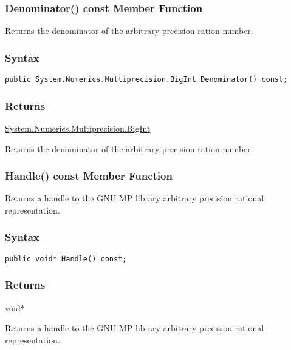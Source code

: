 \documentclass[a4paper,oneside,11.000000pt]{book}
\begin{document}
\hypertarget{System.Numerics.Multiprecision.BigRational.Denominator.C.P.System.Numerics.Multiprecision.BigRational}{\subsubsection*{Denominator() const Member Function}}
\begin{flushleft}
Returns the denominator of the arbitrary precision ration number.

\end{flushleft}
\subsubsection*{Syntax}
\texttt{public System.Numerics.Multiprecision.BigInt Denominator() const;}
\subsubsection*{Returns}
\hyperlink{System.Numerics.Multiprecision.BigInt}{System.\-Numerics.\-Multiprecision.\-BigInt}
\begin{flushleft}
Returns the denominator of the arbitrary precision ration number.

\end{flushleft}
\clearpage

\hypertarget{System.Numerics.Multiprecision.BigRational.Handle.C.P.System.Numerics.Multiprecision.BigRational}{\subsubsection*{Handle() const Member Function}}
\begin{flushleft}
Returns a handle to the GNU MP library arbitrary precision rational representation.

\end{flushleft}
\subsubsection*{Syntax}\texttt{public void* Handle() const;}

\subsubsection*{Returns}void*
\begin{flushleft}
Returns a handle to the GNU MP library arbitrary precision rational representation.

\end{flushleft}
\clearpage
\end{document}
